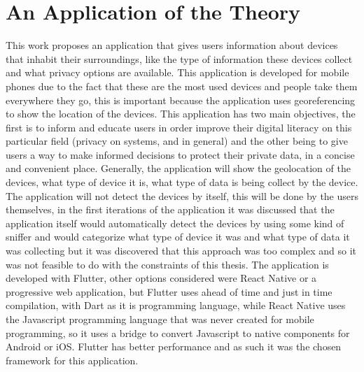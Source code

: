 %
%
\section{An Application of the Theory}
\label{section:stage2}

This work proposes an application that gives users information about \hyperlink{\acronym}{\acronym}
devices that inhabit their surroundings, like the type of information these devices
collect and what privacy options are available. This application is developed
for mobile phones due to the fact that these are the most used devices
and people take them everywhere they go, this is important because the application
uses georeferencing to show the location of the \hyperlink{\acronym}{\acronym} devices. This application
has two main objectives, the first is to inform and educate users in order improve
their digital literacy on this particular field (privacy on \hyperlink{\acronym}{\acronym} systems, and
\hyperlink{\acronym}{\acronym} in general) and the other being to give users a way to make informed decisions
to protect their private data, in a concise and convenient place. Generally,
the application will show the geolocation of the \hyperlink{\acronym}{\acronym} devices, what type of
device it is, what type of data is being collect by the device. The application
will not detect the devices by itself, this will be done by the users themselves,
in the first iterations of the application it was discussed that the application
itself would automatically detect the devices by using some kind of sniffer
and would categorize what type of device it was and what type of data it
was collecting but it was discovered that this approach was too complex and
so it was not feasible to do with the constraints of this thesis. The application
is developed with Flutter, other options considered were React Native or a
progressive web application, but Flutter uses ahead of time and just in time
compilation, with Dart as it is programming language, while React Native uses
the Javascript programming language that was never created for mobile programming,
so it uses a bridge to convert Javascript to native components for Android
or iOS. Flutter has better performance and as such it was the chosen framework
for this application.

